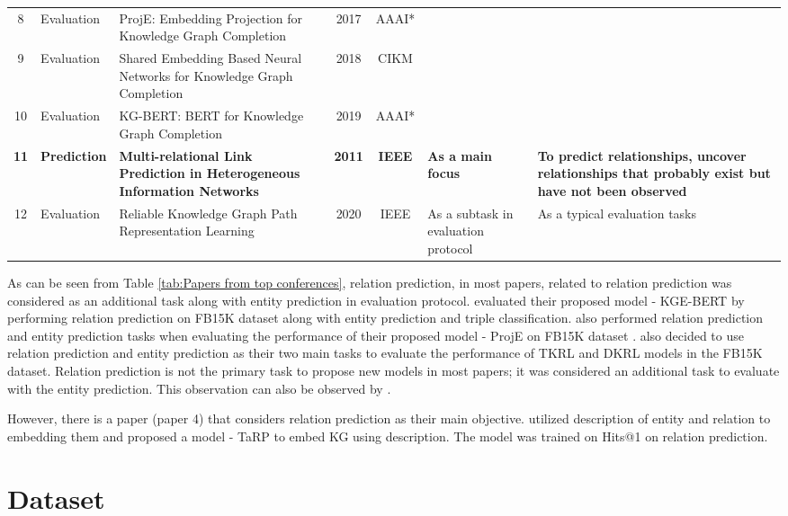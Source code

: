 \begin{table}[!htbp]
{\begin{tabular}{@{}clP{0.5\textwidth}ccP{0.3\textwidth}P{0.3\textwidth}@{}}
8 &
  Evaluation &
  ProjE: Embedding Projection for Knowledge Graph Completion &
  2017 &
  AAAI* &
   &
   \\
9 &
  Evaluation &
  Shared Embedding Based Neural Networks for Knowledge Graph Completion &
  2018 &
  CIKM &
   &
   \\
10 &
  Evaluation &
  KG-BERT: BERT for Knowledge Graph Completion &
  2019 &
  AAAI* &
   &
   \\
\textbf{11} &
  \textbf{Prediction} &
  \textbf{Multi-relational Link Prediction in Heterogeneous Information Networks} &
  \textbf{2011} &
  \textbf{IEEE} &
  \textbf{As a main focus} &
  \textbf{To predict relationships, uncover relationships that probably exist but have not been observed} \\
12 &
  Evaluation &
  Reliable Knowledge Graph Path Representation Learning &
  2020 &
  IEEE &
  As a subtask in evaluation protocol &
  As a typical evaluation tasks \\ \bottomrule
\end{tabular}
}
\end{table}

As can be seen from Table \ref{tab:Papers from top conferences}, relation prediction, in most papers, related to relation prediction was considered as an additional task along with entity prediction in evaluation protocol. \citet{yao2019kg} evaluated their proposed model - KGE-BERT by performing relation prediction on FB15K dataset along with entity prediction and triple classification. \citet{shi2017proje} also performed relation prediction and entity prediction tasks when evaluating the performance of their proposed model - ProjE on FB15K dataset \citep{NIPS2013_1cecc7a7}. \citet{Xie_Liu_Jia_Luan_Sun_2016, xie2016representation} also decided to use relation prediction and entity prediction as their two main tasks to evaluate the performance of TKRL and DKRL models in the FB15K dataset. Relation prediction is not the primary task to propose new models in most papers; it was considered an additional task to evaluate with the entity prediction. This observation can also be observed by \citet{chang2020benchmark}.

However, there is a paper (paper 4) that considers relation prediction as their main objective. \citet{cui2021type} utilized description of entity and relation to embedding them and proposed a model - TaRP to embed KG using description. The model was trained on Hits@1 on relation prediction.

\section{Dataset}

